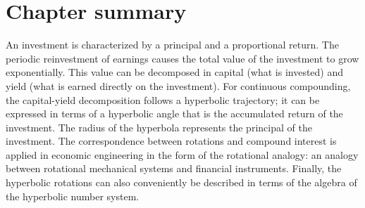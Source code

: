 \section*{Chapter summary}
An investment is characterized by a principal and a proportional return. The periodic reinvestment of earnings causes the total value of the investment to grow exponentially. This value can be decomposed in capital (what is invested) and yield (what is earned directly on the investment). For continuous compounding, the capital-yield decomposition follows a hyperbolic trajectory; it can be expressed in terms of a hyperbolic angle that is the accumulated return of the investment. The radius of the hyperbola represents the principal of the investment. The correspondence between rotations and compound interest is applied in economic engineering in the form of the rotational analogy: an analogy between rotational mechanical systems and financial instruments. Finally, the hyperbolic rotations can also conveniently be described in terms of the algebra of the hyperbolic number system.

